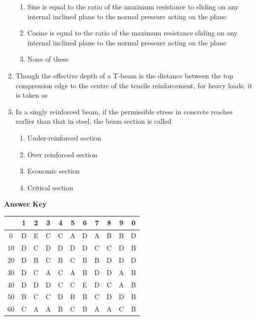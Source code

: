 \documentclass[11pt,a4paper]{article}
\begin{document}
\begin{enumerate}
\begin{enumerate}[label=\Alph*.]
\item{Sine is equal to the ratio of the maximum resistance to sliding on any internal inclined plane to the normal pressure acting on the plane}
\item{Cosine is equal to the ratio of the maximum resistance sliding on any internal inclined plane to the normal pressure acting on the plane}
\item{None of these}
\end{enumerate}
\item{Though the effective depth of a T-beam is the distance between the top compression edge to the centre of the tensile reinforcement, for heavy loads, it is taken as}
\\
\item{In a singly reinforced beam, if the permissible stress in concrete reaches earlier than that in steel, the beam section is called}
\begin{enumerate}[label=\Alph*.]
\item{Under-reinforced section}
\item{Over reinforced section}
\item{Economic section}
\item{Critical section}
\end{enumerate}
\end{enumerate}
\textbf{Answer Key}
\begin{tabular}{ | c | c c c c c c c c c c | }
\hline
 & 1 & 2 & 3 & 4 & 5 & 6 & 7 & 8 & 9 & 0 \\
\hline
0 & D & E & C & C & A & D & A & B & B & D \\
10 & D & C & D & D & D & D & C & C & D & B \\
20 & D & B & C & B & C & B & B & D & D & D \\
30 & D & C & A & C & A & B & D & D & A & B \\
40 & D & D & D & C & C & E & D & C & A & B \\
50 & B & C & C & D & B & B & C & D & D & B \\
60 & C & A & A & B & C & B & A & A & C & B \\
\hline
\end{tabular}
\clearpage
\end{document}
